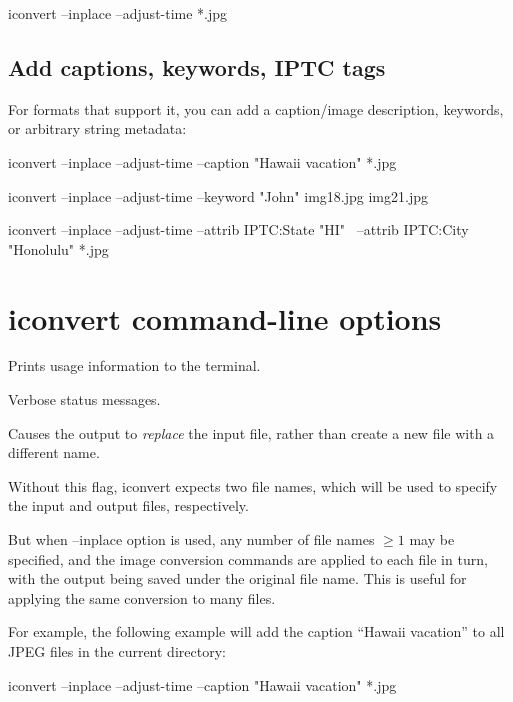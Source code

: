 \begin{code}
    iconvert --inplace --adjust-time *.jpg
\end{code}

\subsection*{Add captions, keywords, IPTC tags}

For formats that support it, you can add a caption/image description,
keywords, or arbitrary string metadata:

\begin{code}
    iconvert --inplace --adjust-time --caption "Hawaii vacation" *.jpg

    iconvert --inplace --adjust-time --keyword "John" img18.jpg img21.jpg

    iconvert --inplace --adjust-time --attrib IPTC:State "HI" \
              --attrib IPTC:City "Honolulu" *.jpg
\end{code}

\medskip

\section{{\cf iconvert} command-line options}

Prints usage information to the terminal.
\apiend

Verbose status messages.
\apiend

Causes the output to \emph{replace} the input file, rather than create a
new file with a different name.

Without this flag, {\cf iconvert} expects two file names, which will
be used to specify the input and output files, respectively.

But when {\cf --inplace} option is used, any number of file names $\ge 1$ may
be specified, and the image conversion commands are applied to each file
in turn, with the output being saved under the original file name.  This
is useful for applying the same conversion to many files.  

For example, the following example will add the caption ``Hawaii
vacation'' to all JPEG files in the current directory:

\begin{code}
        iconvert --inplace --adjust-time --caption "Hawaii vacation" *.jpg
\end{code}
\apiend

